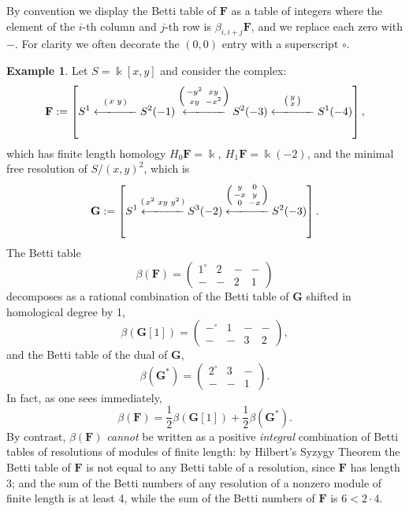 \documentclass[12pt]{amsart}
\theoremstyle{definition}
\newtheorem{example}[lemma]{Example}
\theoremstyle{remark}
\newcommand{\kk}{\Bbbk}
\newcommand{\bG}{\mathbf{G}}
\newcommand{\FF}{\mathbf{F}}
\begin{document}
By convention we display the Betti table of $\FF$ as a table
of integers where the element of the $i$-th column and $j$-th row is $\beta_{i,i+j}\FF$, and we replace each zero with $-$. For clarity we often decorate the $(0,0)$ entry
with a superscript $\circ$.

\begin{example}
Let $S=\kk[x,y]$ and consider the complex:
\[
\FF := \left[S^1\overset{\left(\begin{smallmatrix}x&y\end{smallmatrix}\right)}{\xlongleftarrow{\hspace*{1.1cm}}} S^2(-1)\overset{\left(\begin{smallmatrix}-y^2&xy\\xy&-x^2\end{smallmatrix}\right)}{\xlongleftarrow{\hspace*{1.1cm}}} S^2(-3)\overset{\left(\begin{smallmatrix}y\\x\end{smallmatrix}\right)}{\xlongleftarrow{\hspace*{1.1cm}}} S^1(-4)\right],
\]
which has finite length homology $H_{0}\FF = \kk,\ H_{1}\FF = \kk(-2)$, and the minimal free resolution of $S/(x,y)^{2}$, which 
is
\[
\bG := 
\left[S^1\overset{\left(\begin{smallmatrix}x^{2}&xy&y^{2}\end{smallmatrix}\right)}
{\xlongleftarrow{\hspace*{1.1cm}}} 
S^3(-2)\overset{\left(\begin{smallmatrix}y&0\\-x&y\\0&-x\end{smallmatrix}\right)}{\xlongleftarrow{\hspace*{1.1cm}}} S^2(-3)\right].
\]
The Betti table
$$
\beta(\FF)=\begin{pmatrix} 1^\circ&2&-&-\\-&-&2&1\end{pmatrix}
$$
decomposes as a rational combination of the Betti table of $\bG$ shifted in 
homological degree by 1,
$$
\beta(\bG[1]) =\begin{pmatrix} -^{\circ}&1&-&-\\-&-&3&2\end{pmatrix},
$$
and the Betti table of the dual of $\bG$, 
$$
\beta(\bG^{*}) = \begin{pmatrix} 2^\circ&3&-\\-&-&1\end{pmatrix}.
$$
In fact, as one sees immediately,
\[
\beta(\FF)=
\frac{1}{2}\beta(\bG[1])
+
\frac{1}{2}\beta(\bG^{*}).
\]
By contrast, $\beta(\FF)$ \emph{cannot} be written as a positive \emph{integral} combination of Betti tables of resolutions of modules of finite length: by Hilbert's Syzygy Theorem the Betti table of $\FF$  is not equal to any Betti table of a resolution, since $\FF$ has length 3; and the sum of the Betti numbers of any resolution of a nonzero module of finite length is at least 4, while the sum of the Betti numbers of $\FF$ is $6<2\cdot 4$.
\end{example}
\end{document}

